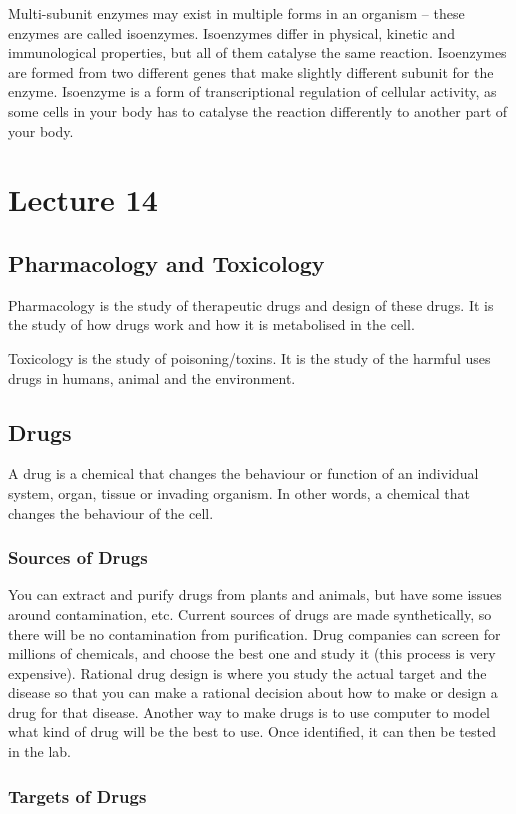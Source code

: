 \documentclass[a4paper, 12pt]{report}
\newcommand{\mychapter}[2]{
    \setcounter{chapter}{#1}
    \setcounter{section}{0}
    \chapter*{#2}
    \addcontentsline{toc}{chapter}{#2}
}
\begin{document}
Multi-subunit enzymes may exist in multiple forms in an organism -- these enzymes are called isoenzymes.
Isoenzymes differ in physical, kinetic and immunological properties, but all of them catalyse the same reaction.
Isoenzymes are formed from two different genes that make slightly different subunit for the enzyme.
Isoenzyme is a form of transcriptional regulation of cellular activity, as some cells in your body has to catalyse the reaction differently to another part of your body.

\mychapter{14}{Lecture 14}

\section{Pharmacology and Toxicology}

Pharmacology is the study of therapeutic drugs and design of these drugs.
It is the study of how drugs work and how it is metabolised in the cell.

Toxicology is the study of poisoning/toxins.
It is the study of the harmful uses drugs in humans, animal and the environment.

\section{Drugs}

A drug is a chemical that changes the behaviour or function of an individual system, organ, tissue or invading organism.
In other words, a chemical that changes the behaviour of the cell.

\subsection{Sources of Drugs}

You can extract and purify drugs from plants and animals, but have some issues around contamination, etc.
Current sources of drugs are made synthetically, so there will be no contamination from purification.
Drug companies can screen for millions of chemicals, and choose the best one and study it (this process is very expensive).
Rational drug design is where you study the actual target and the disease so that you can make a rational decision about how to make or design a drug for that disease.
Another way to make drugs is to use computer to model what kind of drug will be the best to use.
Once identified, it can then be tested in the lab.

\subsection{Targets of Drugs}
\end{document}
